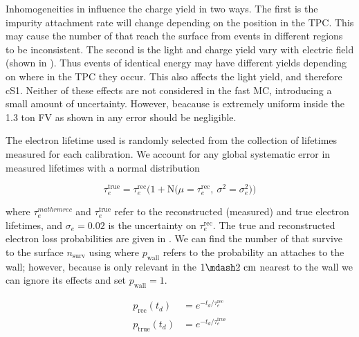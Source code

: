 Inhomogeneities in \ed influence the charge yield in two ways.  The first is the impurity attachment rate will change depending on the
position in the TPC.   This may cause the number of \electron that reach the surface from events in different regions to be
inconsistent.  The second is the light and charge yield vary with electric field (shown in
).  Thus events of identical energy may have
different yields depending on where in the TPC they occur.  This also affects the light yield, and therefore cS1.  Neither of these
effects are not considered
in the fast MC, introducing a small amount of uncertainty.  However, beacause \ed is extremely uniform inside the 1.3 ton FV as shown in
 any error should be negligible.

The electron lifetime used is randomly selected from the collection of lifetimes measured for each calibration.  We account for any global
systematic error in measured lifetimes  with a normal distribution

\begin{equation}
\tau_{e}^{\mathrm{true}} = \tau_{e}^{\mathrm{rec}} \bigg( 1 + \mathrm{N} \big( \mu = \tau_{e}^{\mathrm{rec}},\ \sigma^2 = \sigma_{e}^2
\big)
\bigg)
\end{equation}

\noindent where $\tau_{e}^{mathrm{rec}}$ and $\tau_{e}^{\mathrm{true}}$ refer to the reconstructed (measured) and true electron
lifetimes, and $\sigma_e = 0.02$ is the uncertainty on $\tau_{e}^{\mathrm{rec}}$.  The true and reconstructed electron loss probabilities
are given in
.  We can find the number of \electron that survive to the surface
$n_{\mathrm{surv}}$ using  where $p_{\mathrm{wall}}$ refers to
the probability an \electron attaches to the wall; however, because is only relevant in the $1 \mdash 2\ \mathrm{cm}$ nearest to the wall
we can ignore its effects and set $p_{\mathrm{wall}} = 1$.


\begin{equation}
\begin{aligned}
p_{\mathrm{rec}} (t_d) &= e^{-t_d / \tau_{e}^{\mathrm{rec}}} \\
p_{\mathrm{true}} (t_d) &= e^{-t_d / \tau_{e}^{\mathrm{true}}}
\end{aligned}
\label{eq:er_nr_calibrations_parameter_determ_det_phys_prob_elifetime}
\end{equation}

